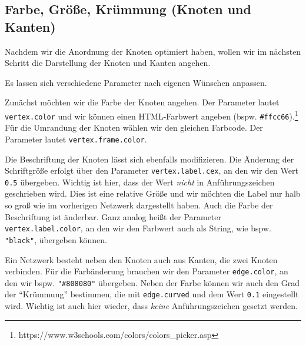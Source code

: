 \documentclass[11pt]{article}
\begin{document}
    \hypertarget{farbe-gruxf6uxdfe-kruxfcmmung-knoten-und-kanten}{%
\subsection{Farbe, Größe, Krümmung (Knoten und
Kanten)}\label{farbe-gruxf6uxdfe-kruxfcmmung-knoten-und-kanten}}

Nachdem wir die Anordnung der Knoten optimiert haben, wollen wir im
nächsten Schritt die Darstellung der Knoten und Kanten angehen.

Es lassen sich verschiedene Parameter nach eigenen Wünschen anpassen.

Zunächst möchten wir die Farbe der Knoten angehen. Der Parameter lautet
\texttt{vertex.color} und wir können einen HTML-Farbwert angeben (bspw.
\texttt{\#ffcc66}).\footnote{https://www.w3schools.com/colors/colors\_picker.asp}
Für die Umrandung der Knoten wählen wir den gleichen Farbcode. Der
Parameter lautet \texttt{vertex.frame.color}.

Die Beschriftung der Knoten lässt sich ebenfalls modifizieren. Die
Änderung der Schriftgröße erfolgt über den Parameter
\texttt{vertex.label.cex}, an den wir den Wert \texttt{0.5} übergeben.
Wichtig ist hier, dass der Wert \emph{nicht} in Anführungszeichen
geschrieben wird. Dies ist eine relative Größe und wir möchten die Label
nur halb so groß wie im vorherigen Netzwerk dargestellt haben. Auch die
Farbe der Beschriftung ist änderbar. Ganz analog heißt der Parameter
\texttt{vertex.label.color}, an den wir den Farbwert auch als String,
wie bspw. \texttt{"black"}, übergeben können.

Ein Netzwerk besteht neben den Knoten auch aus Kanten, die zwei Knoten
verbinden. Für die Farbänderung brauchen wir den Parameter
\texttt{edge.color}, an den wir bspw. \texttt{"\#808080"} übergeben.
Neben der Farbe können wir auch den Grad der ``Krümmung'' bestimmen, die
mit \texttt{edge.curved} und dem Wert \texttt{0.1} eingestellt wird.
Wichtig ist auch hier wieder, dass \emph{keine} Anführungszeichen
gesetzt werden.
\end{document}
